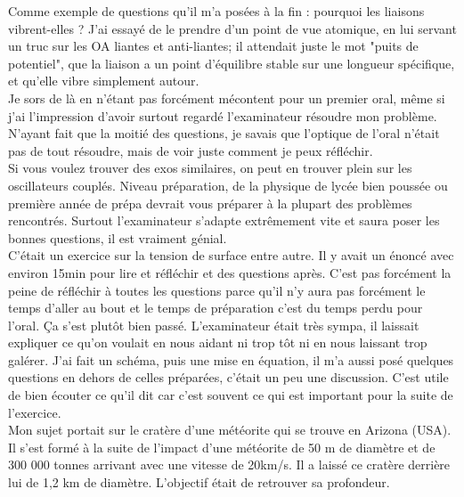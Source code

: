 Comme exemple de questions qu'il m'a posées à la fin : pourquoi les liaisons vibrent-elles ? J'ai essayé de le prendre d'un point de vue atomique, en lui servant un truc sur les OA liantes et anti-liantes; il attendait juste le mot "puits de potentiel", que la liaison a un point d'équilibre stable sur une longueur spécifique, et qu'elle vibre simplement autour.\\

Je sors de là en n'étant pas forcément mécontent pour un premier oral, même si j'ai l'impression d'avoir surtout regardé l'examinateur résoudre mon problème. N'ayant fait que la moitié des questions, je savais que l'optique de l'oral n'était pas de tout résoudre, mais de voir juste comment je peux réfléchir. \\

Si vous voulez trouver des exos similaires, on peut en trouver plein sur les oscillateurs couplés. Niveau préparation, de la physique de lycée bien poussée ou première année de prépa devrait vous préparer à la plupart des problèmes rencontrés. Surtout l'examinateur s'adapte extrêmement vite et saura poser les bonnes questions, il est vraiment génial.\\


\lettrine{{\color{yellow!80!black} \oldpilcrowfive}}{}
C’était un exercice sur la tension de surface entre autre. Il y avait un énoncé avec environ 15min pour
lire et réfléchir et des questions après. C’est pas forcément la peine de réfléchir à toutes les
questions parce qu’il n’y aura pas forcément le temps d’aller au bout et le temps de préparation c’est
du temps perdu pour l’oral. Ça s’est plutôt bien passé. L’examinateur était très sympa, il laissait
expliquer ce qu’on voulait en nous aidant ni trop tôt ni en nous laissant trop galérer. J’ai fait un
schéma, puis une mise en équation, il m’a aussi posé quelques questions en dehors de celles
préparées, c’était un peu une discussion. C’est utile de bien écouter ce qu’il dit car c’est souvent ce
qui est important pour la suite de l’exercice.\\

\lettrine{{\color{violet} \oldpilcrowfive}}{}
Mon sujet portait sur le cratère d’une météorite qui se trouve en Arizona (USA).
Il s’est formé à la suite de l’impact d’une météorite de 50 m de diamètre et de 300 000 tonnes arrivant avec une vitesse de 20km/s. Il a laissé ce cratère derrière lui de 1,2 km de diamètre. L’objectif était de retrouver sa profondeur.\\

